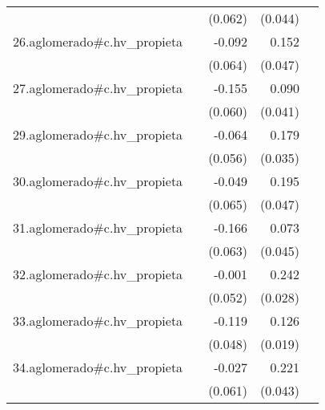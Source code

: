 {\begin{longtable}{l*{4}{D{.}{.}{-1}}}
            &                     &     (0.062)         &     (0.044)         &                     \\
\addlinespace
26.aglomerado#c.hv\_propieta&                     &      -0.092         &       0.152\sym{**} &                     \\
            &                     &     (0.064)         &     (0.047)         &                     \\
\addlinespace
27.aglomerado#c.hv\_propieta&                     &      -0.155\sym{**} &       0.090\sym{*}  &                     \\
            &                     &     (0.060)         &     (0.041)         &                     \\
\addlinespace
29.aglomerado#c.hv\_propieta&                     &      -0.064         &       0.179\sym{***}&                     \\
            &                     &     (0.056)         &     (0.035)         &                     \\
\addlinespace
30.aglomerado#c.hv\_propieta&                     &      -0.049         &       0.195\sym{***}&                     \\
            &                     &     (0.065)         &     (0.047)         &                     \\
\addlinespace
31.aglomerado#c.hv\_propieta&                     &      -0.166\sym{**} &       0.073         &                     \\
            &                     &     (0.063)         &     (0.045)         &                     \\
\addlinespace
32.aglomerado#c.hv\_propieta&                     &      -0.001         &       0.242\sym{***}&                     \\
            &                     &     (0.052)         &     (0.028)         &                     \\
\addlinespace
33.aglomerado#c.hv\_propieta&                     &      -0.119\sym{*}  &       0.126\sym{***}&                     \\
            &                     &     (0.048)         &     (0.019)         &                     \\
\addlinespace
34.aglomerado#c.hv\_propieta&                     &      -0.027         &       0.221\sym{***}&                     \\
            &                     &     (0.061)         &     (0.043)         &                     \\

\end{longtable}}
